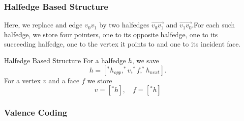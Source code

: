 \documentclass{panikzettel}
\begin{document}
\begin{halfboxl}
\subsubsection*{Halfedge Based Structure}

Here, we replace and edge $v_0 v_1$ by two halfedges $\overrightarrow{v_0 v_1}$ and $\overrightarrow{v_1 v_0}$.For each such halfedge, we store four pointers, one to its opposite halfedge, one to its succeeding halfedge, one to the vertex it points to and one to its incident face.
\end{halfboxl}%
\begin{halfboxr}
\vspace{-\baselineskip}
\begin{defi}{Halfedge Based Structure}
For a halfedge $h$, we save $$h = [^*h_{opp},^*v,^*f,^*h_{next}].$$
For a vertex $v$ and a face $f$ we store $$v = [^*h], \quad f = [^*h]$$
\end{defi}
\end{halfboxr}

\subsubsection*{Valence Coding}
\end{document}
